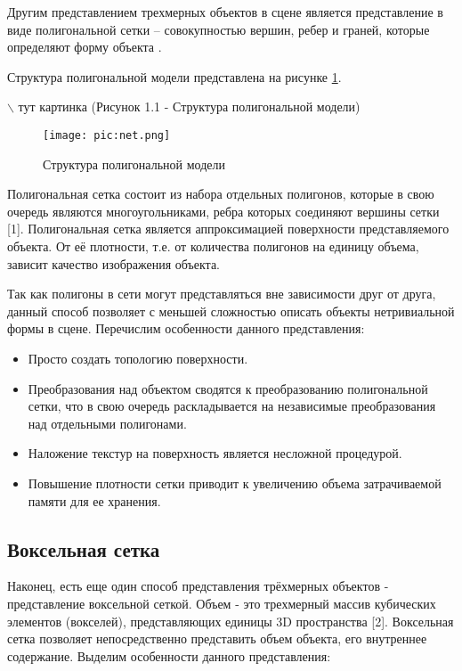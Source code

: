 Другим представлением трехмерных объектов в сцене является представление в виде полигональной сетки -- совокупностью вершин, ребер и граней, которые определяют форму объекта \cite{net-model}.

 Структура полигональной модели представлена на рисунке \ref{pic:net}.

$\backslash$ тут картинка (Рисунок 1.1 - Структура полигональной модели)

\begin{figure}
	\centering
	\texttt{[image: pic:net.png]}
	\caption{Структура полигональной модели}
	\label{pic:net}
\end{figure}

Полигональная сетка состоит из набора отдельных полигонов, которые в свою очередь являются многоугольниками, ребра которых соединяют вершины сетки [1]. Полигональная сетка является аппроксимацией поверхности представляемого объекта. От её плотности, т.е. от количества полигонов на единицу объема, зависит качество изображения объекта.

Так как полигоны в сети могут представляться вне зависимости друг от друга, данный способ позволяет с меньшей сложностью описать объекты нетривиальной формы в сцене. Перечислим особенности данного представления:

\begin{itemize}[$\bullet$]
	\item Просто создать топологию поверхности.
	\item Преобразования над объектом сводятся к преобразованию полигональной сетки, что в свою очередь раскладывается на независимые преобразования над отдельными полигонами.
	\item Наложение текстур на поверхность является несложной процедурой.
	\item Повышение плотности сетки приводит к увеличению объема затрачиваемой памяти для ее хранения.
\end{itemize}

\subsection{Воксельная сетка}

Наконец, есть еще один способ представления трёхмерных объектов - представление воксельной сеткой. Объем - это трехмерный массив кубических элементов (вокселей), представляющих единицы 3D пространства [2]. Воксельная сетка позволяет непосредственно представить объем объекта, его внутреннее содержание. Выделим особенности данного представления:

